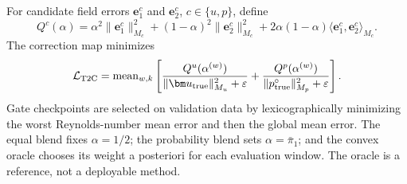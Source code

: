 For candidate field errors $\bm e_1^c$ and $\bm e_2^c$,
$c\in\{u,p\}$, define
\begin{equation}
 Q^c(\alpha)=\alpha^2\|\bm e_1^c\|_{M_c}^2
 +(1-\alpha)^2\|\bm e_2^c\|_{M_c}^2
 +2\alpha(1-\alpha)\langle\bm e_1^c,\bm e_2^c\rangle_{M_c}.
\end{equation}
The correction map minimizes
\begin{equation}
 \mathcal L_{\rm T2C}=\operatorname{mean}_{w,k}\left[
 \frac{Q^u(\alpha^{(w)})}{\|\bm u_{\rm true}\|_{M_u}^2+\varepsilon}
 +\frac{Q^p(\alpha^{(w)})}{\|p^\circ_{\rm true}\|_{M_p}^2+\varepsilon}
 \right].
 \label{eq:app_t2c_loss}
\end{equation}
Gate checkpoints are selected on validation data by lexicographically
minimizing the worst Reynolds-number mean error and then the global mean
error. The equal blend fixes $\alpha=1/2$; the probability blend sets
$\alpha=\bar\pi_1$; and the convex oracle chooses its weight a posteriori for
each evaluation window. The oracle is a reference, not a deployable method.
